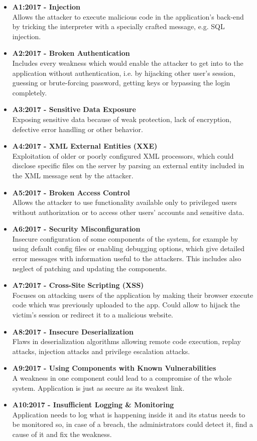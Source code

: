 \documentclass[a4paper]{article}
\begin{document}
\begin{itemize}
	\item \textbf{A1:2017 - Injection} \\
		Allows the attacker to execute malicious code in the
		application's back-end by tricking the interpreter with a
		specially crafted message, e.g. SQL injection.
	\item \textbf{A2:2017 - Broken Authentication} \\
		Includes every weakness which would enable the attacker to get
		into to the application without authentication, i.e. by 
		hijacking other user's session, guessing or brute-forcing
		password, getting keys or bypassing the login completely.
	\item \textbf{A3:2017 - Sensitive Data Exposure} \\
		Exposing sensitive data because of weak protection, lack of
		encryption, defective error handling or other behavior.
	\item \textbf{A4:2017 - XML External Entities (XXE)} \\
		Exploitation of older or poorly configured XML processors, which
		could disclose specific files on the server by parsing an
		external entity included in the XML message sent by the
		attacker.
	\item \textbf{A5:2017 - Broken Access Control} \\
		Allows the attacker to use functionality available only to
		privileged users without authorization or to access other users'
		accounts and sensitive data.
	\item \textbf{A6:2017 - Security Misconfiguration} \\
		Insecure configuration of some components of the system, for
		example by using default config files or enabling debugging
		options, which give detailed error messages with information
		useful to the attackers. This includes also neglect of patching
		and updating the components.
	\item \textbf{A7:2017 - Cross-Site Scripting (XSS)} \\
		Focuses on attacking users of the application by making their
		browser execute code which was previously uploaded to the
		app. Could allow to hijack the victim's session or redirect it
		to a malicious website. 
	\item \textbf{A8:2017 - Insecure Deserialization} \\
		Flaws in deserialization algorithms allowing remote code
		execution, replay attacks, injection attacks and privilege
		escalation attacks.
	\item \textbf{A9:2017 - Using Components with Known Vulnerabilities} \\
		A weakness in one component could lead to a compromise of the
		whole system. Application is just as secure as its weakest link.
	\item \textbf{A10:2017 - Insufficient Logging \& Monitoring} \\
		Application needs to log what is happening inside it and its
		status needs to be monitored so, in case of a breach,
		the administrators could detect it, find a cause of it and fix
		the weakness.
\end{itemize}
\end{document}
